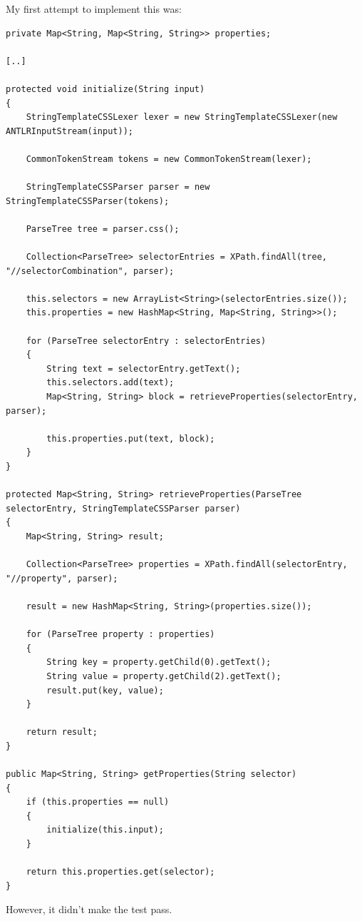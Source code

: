\documentclass[11pt]{article}
\begin{document}
My first attempt to implement this was:

\begin{verbatim}
private Map<String, Map<String, String>> properties;

[..]

protected void initialize(String input)
{
    StringTemplateCSSLexer lexer = new StringTemplateCSSLexer(new ANTLRInputStream(input));

    CommonTokenStream tokens = new CommonTokenStream(lexer);

    StringTemplateCSSParser parser = new StringTemplateCSSParser(tokens);

    ParseTree tree = parser.css();

    Collection<ParseTree> selectorEntries = XPath.findAll(tree, "//selectorCombination", parser);

    this.selectors = new ArrayList<String>(selectorEntries.size());
    this.properties = new HashMap<String, Map<String, String>>();

    for (ParseTree selectorEntry : selectorEntries)
    {
        String text = selectorEntry.getText();
        this.selectors.add(text);
        Map<String, String> block = retrieveProperties(selectorEntry, parser);

        this.properties.put(text, block);
    }
}

protected Map<String, String> retrieveProperties(ParseTree selectorEntry, StringTemplateCSSParser parser)
{
    Map<String, String> result;

    Collection<ParseTree> properties = XPath.findAll(selectorEntry, "//property", parser);

    result = new HashMap<String, String>(properties.size());

    for (ParseTree property : properties)
    {
        String key = property.getChild(0).getText();
        String value = property.getChild(2).getText();
        result.put(key, value);
    }

    return result;
}

public Map<String, String> getProperties(String selector)
{
    if (this.properties == null)
    {
        initialize(this.input);
    }

    return this.properties.get(selector);
}
\end{verbatim}

However, it didn't make the test pass.
\end{document}
